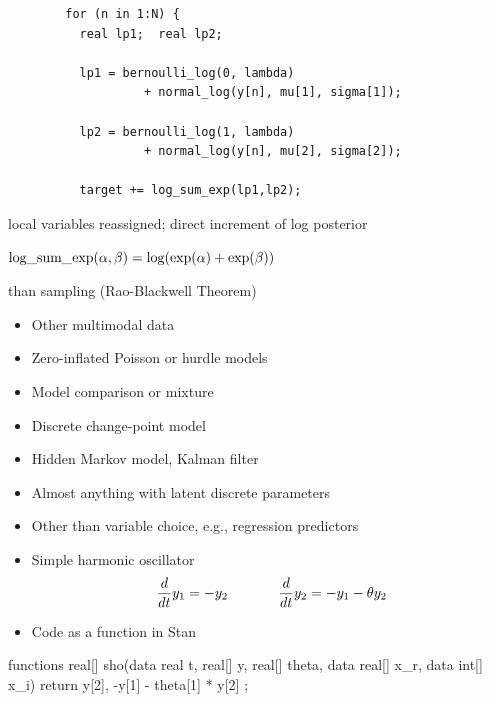 \documentclass[10pt]{report}
\begin{document}
%
{\footnotesize
\begin{Verbatim}
        for (n in 1:N) {
          real lp1;  real lp2;

          lp1 = bernoulli_log(0, lambda)
                   + normal_log(y[n], mu[1], sigma[1]);

          lp2 = bernoulli_log(1, lambda)
                   + normal_log(y[n], mu[2], sigma[2]);

          target += log_sum_exp(lp1,lp2);
\end{Verbatim}
}
\vspace*{2pt}
\begin{subitemize}
\item local variables reassigned; direct increment of log posterior
\item $\mbox{\rm log\_sum\_exp}(\alpha,\beta) = \log (\exp(\alpha) + \exp(\beta))$
\item {} than sampling (Rao-Blackwell Theorem)
\vspace*{10pt}
\end{subitemize}


%
\begin{itemize}
\item Other multimodal data
\item Zero-inflated Poisson or hurdle models
\item Model comparison or mixture
\item Discrete change-point model
\item Hidden Markov model, Kalman filter
\item Almost anything with latent discrete parameters
\hfill
\item Other than variable choice, e.g., regression predictors
\end{itemize}


%
\begin{itemize}
\item Simple harmonic oscillator
{\small
\begin{equation*}
\frac{d}{dt} y_1 = -y_2
\hspace*{0.5in}
\frac{d}{dt} y_2 = -y_1 - \theta y_2
\end{equation*}
}
\item Code as a function in Stan
\end{itemize}
\begin{stancode}
functions {
  real[] sho(data real t, real[] y, real[] theta,
             data real[] x_r, data int[] x_i) {
    return { y[2],
             -y[1] - theta[1] * y[2] };
  }
}
\end{stancode}
\end{document}
